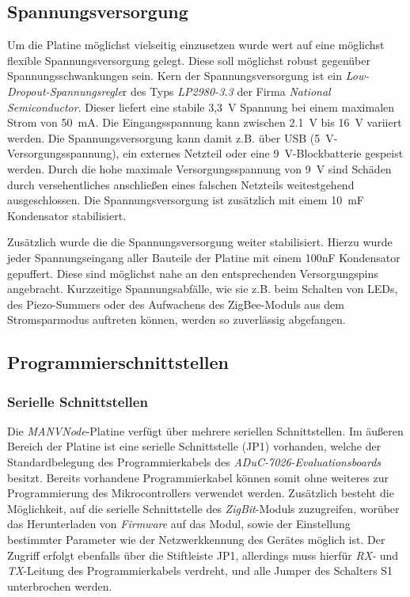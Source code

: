 \subsection{Spannungsversorgung}
Um die Platine möglichst vielseitig einzusetzen wurde wert auf eine möglichst flexible Spannungsversorgung gelegt. Diese
soll möglichst robust gegenüber Spannungsschwankungen sein. Kern der Spannungsversorgung ist ein 
\emph{Low-Dropout-Spannungsregle}r des Typs \emph{LP2980-3.3} der Firma \emph{National Semiconductor}. Dieser liefert eine stabile
3,3~V Spannung bei einem maximalen Strom von 50~mA. Die Eingangsspannung kann zwischen 2.1~V bis 16~V variiert werden.
Die Spannungsversorgung kann damit z.B. über USB (5~V-Versorgungsspannung), ein externes Netzteil oder eine 
9~V-Blockbatterie gespeist werden. Durch die hohe maximale Versorgungsspannung von 9~V sind Schäden durch versehentliches
anschließen eines falschen Netzteils weitestgehend ausgeschlossen. Die Spannungsversorgung ist zusätzlich mit einem 10~mF 
Kondensator stabilisiert.

Zusätzlich wurde die die Spannungsversorgung weiter stabilisiert. Hierzu wurde jeder Spannungseingang aller Bauteile der
Platine mit einem 100nF Kondensator gepuffert. Diese sind möglichst nahe an den entsprechenden Versorgungspins angebracht.
Kurzzeitige Spannungsabfälle, wie sie z.B. beim Schalten von LEDs, des Piezo-Summers oder des Aufwachens des ZigBee-Moduls
aus dem Stromsparmodus auftreten können, werden so zuverlässig abgefangen.

\subsection{Programmierschnittstellen}

\subsubsection{Serielle Schnittstellen}
Die \emph{MANVNode}-Platine verfügt über mehrere seriellen Schnittstellen. Im äußeren Bereich der Platine ist eine serielle 
Schnittstelle (JP1) vorhanden, welche der Standardbelegung des Programmierkabels des \emph{ADuC-7026-Evaluationsboards}
besitzt.  Bereits vorhandene Programmierkabel können somit ohne weiteres zur Programmierung des Mikrocontrollers 
verwendet werden.  Zusätzlich besteht die Möglichkeit, auf die serielle Schnittstelle des \emph{ZigBit}-Moduls 
zuzugreifen, worüber das Herunterladen von \emph{Firmware} auf das Modul, sowie der Einstellung bestimmter 
Parameter wie der Netzwerkkennung des Gerätes möglich ist.
Der Zugriff erfolgt ebenfalls über die Stiftleiste JP1, allerdings muss hierfür \emph{RX-} und \emph{TX}-Leitung des 
Programmierkabels verdreht, und alle Jumper des Schalters S1 unterbrochen werden. 

